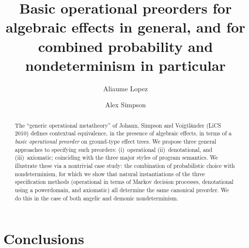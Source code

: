 \documentclass[a4paper,UKenglish]{lipics-v2018}
\title{Basic operational preorders  for algebraic effects in general, and for
combined probability and nondeterminism in particular}
\author{Aliaume Lopez}{\'Ecole Normale Sup\'erieure Paris-Saclay\\{Universit\'e Paris-Saclay, France}}{aliaume.lopez@ens-paris-saclay.fr}{}{}%
\author{Alex Simpson}{Faculty of Mathematics and Physics\\{University of Ljubljana, Slovenia}}{Alex.Simpson@fmf.uni-lj.si}{}{}
\theoremstyle{plain}
\begin{document}
\maketitle

\begin{abstract}
The ``generic operational metatheory'' of  Johann, Simpson and Voigtl\"{a}nder (LiCS 2010) defines
contextual equivalence, 
in the presence of algebraic effects, in terms of a
\emph{basic operational preorder} on ground-type effect trees. We propose three general approaches to 
specifying such preorders: (i)~operational (ii)~denotational, and (iii)~axiomatic; coinciding with the three major styles of program semantics. We illustrate these via a nontrivial case study: the combination of probabilistic choice with nondeterminism, for which we show that  natural instantiations of the three specification methods (operational in terms of Markov decision processes, denotational using  a powerdomain, and axiomatic) all determine the same canonical preorder. We do this in the case of both angelic and demonic nondeterminism. 
 \end{abstract}

















\section{Conclusions}
\label{section:conclusions}



\end{document}
